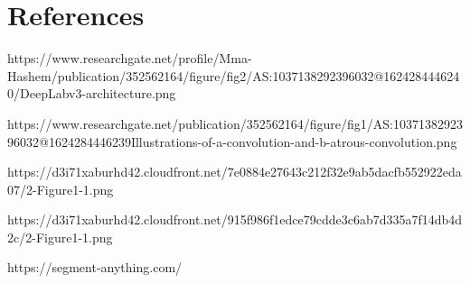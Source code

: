 \section{References}

\begin{thebibliography}{00}

 https://www.researchgate.net/profile/Mma-Hashem/publication/352562164/figure/fig2/AS:1037138292396032@1624284446240/DeepLabv3-architecture.png

 https://www.researchgate.net/publication/352562164/figure/fig1/AS:1037138292396032@1624284446239Illustrations-of-a-convolution-and-b-atrous-convolution.png

 https://d3i71xaburhd42.cloudfront.net/7e0884e27643c212f32e9ab5dacfb552922eda07/2-Figure1-1.png

 https://d3i71xaburhd42.cloudfront.net/915f986f1edce79cdde3c6ab7d335a7f14db4d2c/2-Figure1-1.png

 https://segment-anything.com/

\end{thebibliography}